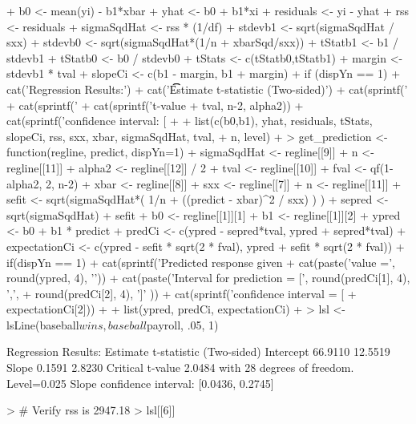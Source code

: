 \documentclass{article}
\begin{document}
\begin{enumerate}
\begin{Schunk}
\begin{Sinput}
{+   b0 <- mean(yi) - b1*xbar
+   yhat <- b0 + b1*xi
+   residuals <- yi - yhat
+   rss <- residuals %*% residuals
+   sigmaSqdHat <- rss * (1/df)
+   stdevb1 <- sqrt(sigmaSqdHat / sxx)
+   stdevb0 <- sqrt(sigmaSqdHat*(1/n + xbarSqd/sxx))
+   tStatb1 <- b1 / stdevb1
+   tStatb0 <- b0 / stdevb0
+   tStats <- c(tStatb0,tStatb1)
+   margin <- stdevb1 * tval
+   slopeCi <- c(b1 - margin, b1 + margin)
+   if (dispYn == 1) {
+     cat('Regression Results:\n')
+     cat('\t  \t  Estimate   t-statistic (Two-sided)\n')
+     cat(sprintf('\tIntercept  %.4f    %.4f\n', b0, tStats[1]))
+     cat(sprintf('\tSlope      %.4f     %.4f\n', b1, tStats[2]))
+     cat(sprintf('\tCritical t-value %.4f with %i degrees of freedom. Level=%.3f\n', 
+               tval, n-2, alpha2))
+     cat(sprintf('\tSlope confidence interval: [%.4f, %.4f]\n\n', slopeCi[1], slopeCi[2]))
+   }    
+   list(c(b0,b1), yhat, residuals, tStats, slopeCi, rss, sxx, xbar, sigmaSqdHat, tval, 
+        n, level)
+ }
> get_prediction <- function(regline, predict, dispYn=1){
+   sigmaSqdHat <- regline[[9]]
+   n <- regline[[11]]
+   alpha2 <- regline[[12]] / 2
+   tval <- regline[[10]]
+   fval <- qf(1-alpha2, 2, n-2)
+   xbar <- regline[[8]]
+   sxx <- regline[[7]]
+   n <- regline[[11]]
+   sefit <- sqrt(sigmaSqdHat*( 1/n + ((predict - xbar)^2 / sxx) ) ) 
+   sepred <- sqrt(sigmaSqdHat) + sefit
+   b0 <- regline[[1]][1]
+   b1 <- regline[[1]][2]
+   ypred <- b0 + b1 * predict
+   predCi <- c(ypred - sepred*tval, ypred + sepred*tval)
+   expectationCi <- c(ypred - sefit * sqrt(2 * fval), ypred + sefit * sqrt(2 * fval))
+   if(dispYn == 1){
+   cat(sprintf('Predicted response given %.2f\n', predict))
+   cat(paste('\ty value =', round(ypred, 4), '\n'))
+   cat(paste('\tConfidence Interval for prediction = [', round(predCi[1], 4), ',',
+                      round(predCi[2], 4), ']\n' )) 
+   cat(sprintf('\tE[Y|X = x] confidence interval = [%.4f, %.4f]', expectationCi[1], 
+               expectationCi[2]))
+   }
+   list(ypred, predCi, expectationCi)
+ }
> lsl <- lsLine(baseball$wins, baseball$payroll, .05, 1)
\end{Sinput}
\begin{Soutput}
Regression Results:
	  	  Estimate   t-statistic (Two-sided)
	Intercept  66.9110    12.5519
	Slope      0.1591     2.8230
	Critical t-value 2.0484 with 28 degrees of freedom. Level=0.025
	Slope confidence interval: [0.0436, 0.2745]
\end{Soutput}
\begin{Sinput}
> # Verify rss is 2947.18
> lsl[[6]]
\end{Sinput}

\end{Schunk}
\end{enumerate}
\end{document}
